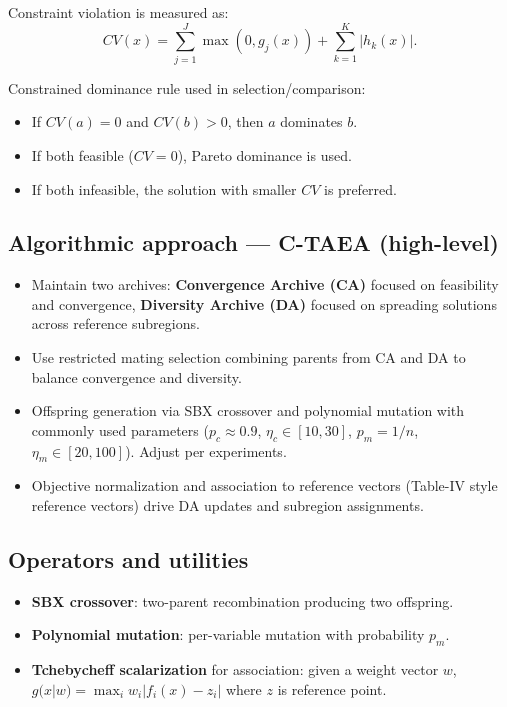 \documentclass[12pt]{article}
\begin{document}
Constraint violation is measured as:
\[
CV(x)=\sum_{j=1}^J\max(0,g_j(x)) + \sum_{k=1}^K |h_k(x)|.
\]

Constrained dominance rule used in selection/comparison:
\begin{itemize}
    \item If $CV(a)=0$ and $CV(b)>0$, then $a$ dominates $b$.
    \item If both feasible ($CV=0$), Pareto dominance is used.
    \item If both infeasible, the solution with smaller $CV$ is preferred.
\end{itemize}

\subsection{Algorithmic approach — C-TAEA (high-level)}
\begin{itemize}
    \item Maintain two archives: \textbf{Convergence Archive (CA)} focused on feasibility and convergence, \textbf{Diversity Archive (DA)} focused on spreading solutions across reference subregions.
    \item Use restricted mating selection combining parents from CA and DA to balance convergence and diversity.
    \item Offspring generation via SBX crossover and polynomial mutation with commonly used parameters ($p_c \approx 0.9$, $\eta_c \in [10,30]$, $p_m = 1/n$, $\eta_m \in [20,100]$). Adjust per experiments.
    \item Objective normalization and association to reference vectors (Table-IV style reference vectors) drive DA updates and subregion assignments.
\end{itemize}

\subsection{Operators and utilities}
\begin{itemize}
    \item \textbf{SBX crossover}: two-parent recombination producing two offspring.
    \item \textbf{Polynomial mutation}: per-variable mutation with probability $p_m$.
    \item \textbf{Tchebycheff scalarization} for association: given a weight vector $w$, $g(x|w)=\max_i w_i |f_i(x)-z_i|$ where $z$ is reference point.
\end{itemize}
\end{document}
